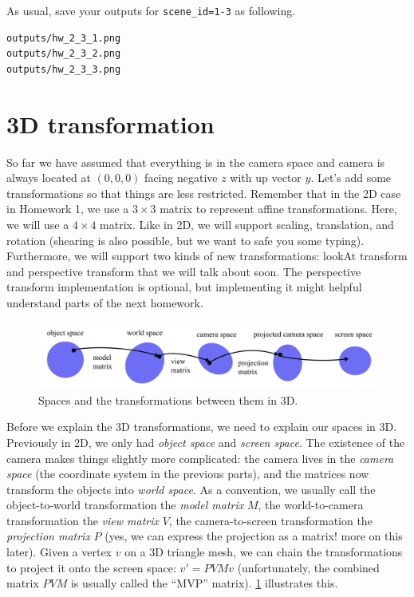 As usual, save your outputs for \lstinline{scene_id=1-3} as following.
\begin{lstlisting}[language=bash]
outputs/hw_2_3_1.png
outputs/hw_2_3_2.png
outputs/hw_2_3_3.png
\end{lstlisting}

\section{3D transformation}

So far we have assumed that everything is in the camera space and camera is always located at $(0, 0, 0)$ facing negative $z$ with up vector $y$. Let's add some transformations so that things are less restricted. Remember that in the 2D case in Homework 1, we use a $3 \times 3$ matrix to represent affine transformations. Here, we will use a $4 \times 4$ matrix. Like in 2D, we will support scaling, translation, and rotation (shearing is also possible, but we want to safe you some typing). Furthermore, we will support two kinds of new transformations: lookAt transform and perspective transform that we will talk about soon. The perspective transform implementation is optional, but implementing it might helpful understand parts of the next homework.

\begin{figure}[h]
    \centering
    \includegraphics[width=0.8\linewidth]{imgs/3d_spaces.pdf}
    \caption{Spaces and the transformations between them in 3D.}
    \label{fig:3d_spaces}
\end{figure}

Before we explain the 3D transformations, we need to explain our spaces in 3D. Previously in 2D, we only had \emph{object space} and \emph{screen space}. The existence of the camera makes things slightly more complicated: the camera lives in the \emph{camera space} (the coordinate system in the previous parts), and the matrices now transform the objects into \emph{world space}. As a convention, we usually call the object-to-world transformation the \emph{model matrix} $M$, the world-to-camera transformation the \emph{view matrix} $V$, the camera-to-screen transformation the \emph{projection matrix} $P$ (yes, we can express the projection as a matrix! more on this later). Given a vertex $v$ on a 3D triangle mesh, we can chain the transformations to project it onto the screen space: $v'=PVMv$ (unfortunately, the combined matrix $PVM$ is usually called the ``MVP'' matrix). \cref{fig:3d_spaces} illustrates this.

